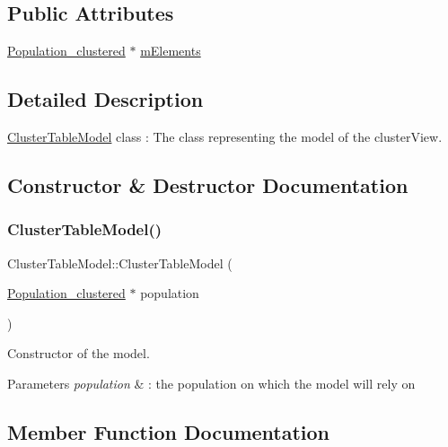 \subsection*{Public Attributes}
\begin{DoxyCompactItemize}
\item 
\hyperlink{class_population__clustered}{Population\+\_\+clustered} $\ast$ \hyperlink{class_cluster_table_model_a8976691d944b9e33a830cd8f3b8f9c7c}{m\+Elements}
\end{DoxyCompactItemize}


\subsection{Detailed Description}
\hyperlink{class_cluster_table_model}{Cluster\+Table\+Model} class \+: The class representing the model of the cluster\+View. 

\subsection{Constructor \& Destructor Documentation}
\mbox{\label{class_cluster_table_model_a56b29a3d0efe69d1012b168e795dbbfa}} 
\subsubsection{\texorpdfstring{Cluster\+Table\+Model()}{ClusterTableModel()}}
{\footnotesize\ttfamily Cluster\+Table\+Model\+::\+Cluster\+Table\+Model (\begin{DoxyParamCaption}\item[{\hyperlink{class_population__clustered}{Population\+\_\+clustered} $\ast$}]{population }\end{DoxyParamCaption})}



Constructor of the model. 


\begin{DoxyParams}{Parameters}
{\em population} & \+: the population on which the model will rely on \\
\hline
\end{DoxyParams}


\subsection{Member Function Documentation}
\mbox{\label{class_cluster_table_model_a21f97aadd6e751800a92c843e6cfd170}} 
